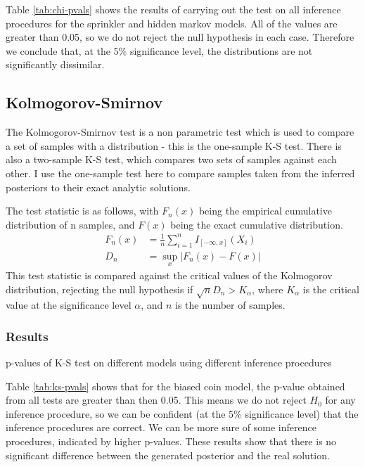 \documentclass[sigconf]{acmart}
\begin{document}
Table \ref{tab:chi-pvals} shows the results of carrying out the test on all inference procedures for the sprinkler and hidden markov models. All of the values are greater than 0.05, so we do not reject the null hypothesis in each case. Therefore we conclude that, at the 5\% significance level, the distributions are not significantly dissimilar.

\subsection{Kolmogorov-Smirnov}

The Kolmogorov-Smirnov test is a non parametric test which is used to compare a set of samples with a distribution - this is the one-sample K-S test. There is also a two-sample K-S test, which compares two sets of samples against each other. I use the one-sample test here to compare samples taken from the inferred posteriors to their exact analytic solutions.

The test statistic is as follows, with $F_n(x)$ being the empirical cumulative distribution of n samples, and $F(x)$ being the exact cumulative distribution.
\begin{align*}
  F_{n}(x) & =\frac{1}{n}\sum_{i=1}^{n}I_{[-\infty ,x]}(X_{i}) \\
  D_{n}    & =\sup_{x}|F_{n}(x)-F(x)|
\end{align*}
This test statistic is compared against the critical values of the Kolmogorov distribution, rejecting the null hypothesis if $\sqrt{n}D_n > K_\alpha$, where $K_\alpha$ is the critical value at the significance level $\alpha$, and $n$ is the number of samples.

\subsubsection{Results}

\begin{table}[!ht]
  \centering
  \normal
  \pgfplotstabletranspose[colnames from = 0]\transpose\normal
  \pgfplotstabletypeset[
  string type,
  every head row/.style={before row=\toprule, after row=\midrule},
  every last row/.style={after row=\bottomrule},
  every col no 0/.style={
    string type,
    column name={Inference Method},
    column type={@{}l}},
  every col no 1/.style={
    column type={c@{}},
    precision=3,
    fixed zerofill=true
  },
  ]\transpose
  \caption{p-values of K-S test on different models using different inference procedures}
  \label{tab:ks-pvals}
\end{table}
Table \ref{tab:ks-pvals} shows that for the biased coin model, the p-value obtained from all tests are greater than then 0.05. This means we do not reject $H_0$ for any inference procedure, so we can be confident (at the 5\% significance level) that the inference procedures are correct. We can be more sure of some inference procedures, indicated by higher p-values. These results show that there is no significant difference between the generated posterior and the real solution.
\end{document}
